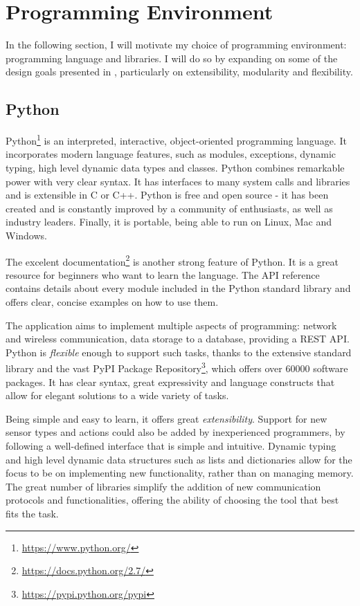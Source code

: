 \section{Programming Environment}

In the following section, I will motivate my choice of programming environment: programming language and libraries. I will do so by expanding on some of the design goals presented in , particularly on extensibility, modularity and flexibility.

\subsection{Python}

Python\footnote{\url{https://www.python.org/}} is an interpreted, interactive, object-oriented programming language. It incorporates modern language features, such as modules, exceptions, dynamic typing, high level dynamic data types and classes. Python combines remarkable power with very clear syntax. It has interfaces to many system calls and libraries and is extensible in C or C++. Python is free and open source - it has been created and is constantly improved by a community of enthusiasts, as well as industry leaders. Finally, it is portable, being able to run on Linux, Mac and Windows.

The excelent documentation\footnote{\url{https://docs.python.org/2.7/}} is another strong feature of Python. It is a great resource for beginners who want to learn the language. The API reference contains details about every module included in the Python standard library and offers clear, concise examples on how to use them.

The application aims to implement multiple aspects of programming: network and wireless communication, data storage to a database, providing a REST API. Python is \textit{flexible} enough to support such tasks, thanks to the extensive standard library and the vast PyPI Package Repository\footnote{\url{https://pypi.python.org/pypi}}, which offers over 60000 software packages. It has clear syntax, great expressivity and language constructs that allow for elegant solutions to a wide variety of tasks.

Being simple and easy to learn, it offers great \textit{extensibility}. Support for new sensor types and actions could also be added by inexperienced programmers, by following a well-defined interface that is simple and intuitive. Dynamic typing and high level dynamic data structures such as lists and dictionaries allow for the focus to be on implementing new functionality, rather than on managing memory. The great number of libraries simplify the addition of new communication protocols and functionalities, offering the ability of choosing the tool that best fits the task.

